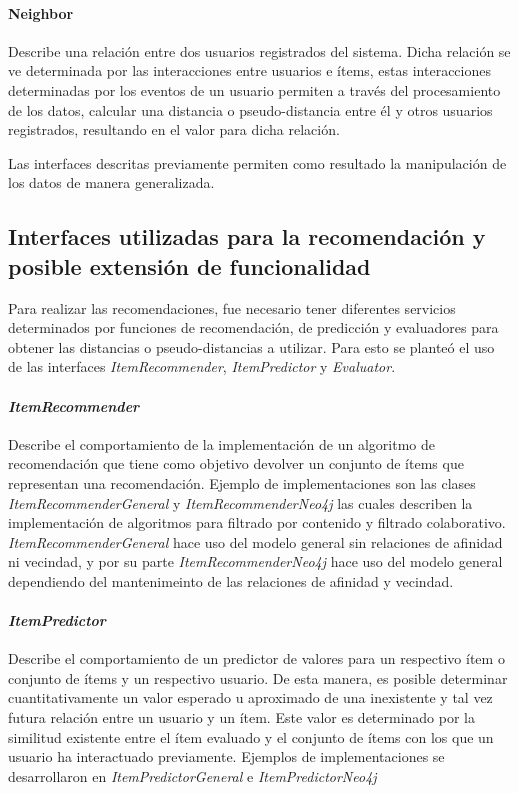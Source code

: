     \paragraph{Neighbor}
    Describe una relación entre dos usuarios registrados del sistema. Dicha relación se ve determinada por las interacciones entre usuarios e ítems, estas interacciones determinadas por los eventos de un usuario permiten a través del procesamiento de los datos, calcular una distancia o pseudo-distancia entre él y otros usuarios registrados, resultando en el valor para dicha relación. 

    Las interfaces descritas previamente permiten como resultado la manipulación de los datos de manera generalizada. 

  \subsection{Interfaces utilizadas para la recomendación y posible extensión de funcionalidad}
    Para realizar las recomendaciones, fue necesario tener diferentes servicios determinados por funciones de recomendación, de predicción y evaluadores para obtener las distancias o pseudo-distancias a utilizar. Para esto se planteó el uso de las interfaces \emph{ItemRecommender}, \emph{ItemPredictor} y \emph{Evaluator}.

    \paragraph{\emph{ItemRecommender}}
      Describe el comportamiento de la implementación de un algoritmo de recomendación que tiene como objetivo devolver un conjunto de ítems que representan una recomendación. Ejemplo de implementaciones son las clases \emph{ItemRecommenderGeneral} y \emph{ItemRecommenderNeo4j} las cuales describen la implementación de algoritmos para filtrado por contenido y filtrado colaborativo. \emph{ItemRecommenderGeneral} hace uso del modelo general sin relaciones de afinidad ni vecindad, y por su parte \emph{ItemRecommenderNeo4j} hace uso del modelo general dependiendo del mantenimeinto de las relaciones de afinidad y vecindad. 

    \paragraph{\emph{ItemPredictor}}
      Describe el comportamiento de un predictor de valores para un respectivo ítem o conjunto de ítems y un respectivo usuario. De esta manera, es posible determinar cuantitativamente un valor esperado u aproximado de una inexistente y tal vez futura relación entre un usuario y un ítem. Este valor es determinado por la similitud existente entre el ítem evaluado y el conjunto de ítems con los que un usuario ha interactuado previamente. Ejemplos de implementaciones se desarrollaron en \emph{ItemPredictorGeneral} e \emph{ItemPredictorNeo4j} 

